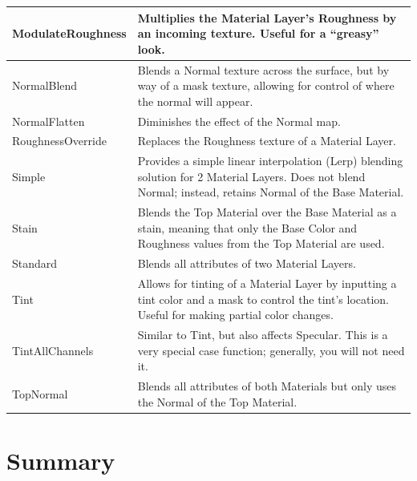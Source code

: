 \begin{table}
\begin{longtable}{|p{3.5cm}|p{9.5cm}|}
		ModulateRoughness & Multiplies the Material Layer's Roughness by an incoming texture. Useful for a ``greasy'' look.                                                               \\ \hline
		NormalBlend       & Blends a Normal texture across the surface, but by way of a mask texture, allowing for control of where the normal will appear.                              \\ \hline
		NormalFlatten     & Diminishes the effect of the Normal map.\,                                                                                                                     \\ \hline
		RoughnessOverride & Replaces the Roughness texture of a Material Layer.                                                                                                          \\ \hline
		Simple            & Provides a simple linear interpolation (Lerp) blending solution for 2 Material Layers. Does not blend Normal; instead, retains Normal of the Base Material.   \\ \hline
		Stain             & Blends the Top Material over the Base Material as a stain, meaning that only the Base Color and Roughness values from the Top Material are used.             \\ \hline
		Standard          & Blends all attributes of two Material Layers.                                                                                                                \\ \hline
		Tint              & Allows for tinting of a Material Layer by inputting a tint color and a mask to control the tint's location. Useful for making partial color changes.         \\ \hline
		TintAllChannels   & Similar to Tint, but also affects Specular. This is a very special case function; generally, you will not need it.                                           \\ \hline
		TopNormal         & Blends all attributes of both Materials but only uses the Normal of the Top Material.                                                                        \\ \hline
	\end{longtable}
\end{table}



\section{Summary}

